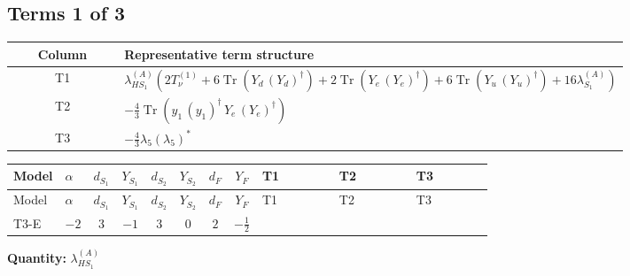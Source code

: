 \documentclass[8pt]{article}
\begin{document}
\begin{landscape}
\subsection*{Terms 1 of 3}
\begin{center}
\begin{tabular}{@{}c >{\raggedright\arraybackslash}p{0.82\linewidth}@{}}
\toprule
Column & Representative term structure \\
\midrule
T1 & \(\displaystyle {\lambda_{HS_1}^{(A)}} (2 T_{\nu}^{(1)}+6 \operatorname{Tr}\!\left({Y_d}\,\left({Y_d}\right)^{\dagger}\right)+2 \operatorname{Tr}\!\left({Y_e}\,\left({Y_e}\right)^{\dagger}\right)+6 \operatorname{Tr}\!\left({Y_u}\,\left({Y_u}\right)^{\dagger}\right)+16 {\lambda_{S_1}^{(A)}})\) \\
\midrule
T2 & \(\displaystyle -\frac{4}{3} \operatorname{Tr}\!\left({y_1}\,\left({y_1}\right)^{\dagger}\,{Y_e}\,\left({Y_e}\right)^{\dagger}\right)\) \\
\midrule
T3 & \(\displaystyle -\frac{4}{3} {\lambda_5} \left({\lambda_5}\right)^{*}\) \\
\midrule
\bottomrule
\end{tabular}
\end{center}
\smallskip
\tiny
\begin{longtable}{@{}llcccccc >{\raggedright\arraybackslash}p{0.21\linewidth} >{\raggedright\arraybackslash}p{0.21\linewidth} >{\raggedright\arraybackslash}p{0.21\linewidth}@{}}
\toprule
Model & $\alpha$ & $d_{S_1}$ & $Y_{S_1}$ & $d_{S_2}$ & $Y_{S_2}$ & $d_F$ & $Y_F$ & T1 & T2 & T3 \\
\midrule
\endfirsthead
\toprule
Model & $\alpha$ & $d_{S_1}$ & $Y_{S_1}$ & $d_{S_2}$ & $Y_{S_2}$ & $d_F$ & $Y_F$ & T1 & T2 & T3 \\
\midrule
\endhead
T3-E & $-2$ & $3$ & $-1$ & $3$ & $0$ & $2$ & $-\frac{1}{2}$ & \scriptsize\adjustbox{max width=\linewidth}{$\begin{gathered} {\lambda_{HS_1}^{(A)}} (2 T_{\nu}^{(1)}+6 \operatorname{Tr}\!\left({Y_d}\,\left({Y_d}\right)^{\dagger}\right)+2 \operatorname{Tr}\!\left({Y_e}\,\left({Y_e}\right)^{\dagger}\right)+6 \operatorname{Tr}\!\left({Y_u}\,\left({Y_u}\right)^{\dagger}\right)+16 {\lambda_{S_1}^{(A)}})\end{gathered}$} & \scriptsize\adjustbox{max width=\linewidth}{$\begin{gathered} -\frac{4}{3} \operatorname{Tr}\!\left({y_1}\,\left({y_1}\right)^{\dagger}\,{Y_e}\,\left({Y_e}\right)^{\dagger}\right)\end{gathered}$} & \scriptsize\adjustbox{max width=\linewidth}{$\begin{gathered} -\frac{4}{3} {\lambda_5} \left({\lambda_5}\right)^{*}\end{gathered}$} \\
\midrule
\bottomrule
\end{longtable}
\clearpage
\noindent\textbf{Quantity: }$\lambda_{HS_1}^{(A)}$\par\smallskip

\end{landscape}
\end{document}
